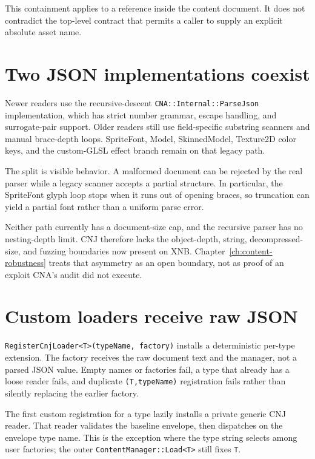 This containment applies to a reference inside the content document.  It does not contradict
the top-level  contract that permits a caller to supply an explicit
absolute asset name.

\section{Two JSON implementations coexist}

Newer readers use the recursive-descent \texttt{CNA::Internal::ParseJson} implementation, which
has strict number grammar, escape handling, and surrogate-pair support.  Older readers still use
field-specific substring scanners and manual brace-depth loops.  SpriteFont, Model, SkinnedModel,
Texture2D color keys, and the custom-GLSL effect branch remain on that legacy path.

The split is visible behavior.  A malformed document can be rejected by the real parser while a
legacy scanner accepts a partial structure.  In particular, the SpriteFont glyph loop stops when
it runs out of opening braces, so truncation can yield a partial font rather than a uniform parse
error.

Neither path currently has a document-size cap, and the recursive parser has no nesting-depth
limit.  CNJ therefore lacks the object-depth, string, decompressed-size, and fuzzing boundaries
now present on XNB.  Chapter~\ref{ch:content-robustness} treats that asymmetry as an open boundary,
not as proof of an exploit CNA's audit did not execute.

\section{Custom loaders receive raw JSON}

\texttt{RegisterCnjLoader<T>(typeName, factory)} installs a deterministic per-type extension.
The factory receives the raw document text and the manager, not a parsed JSON value.  Empty names
or factories fail, a type that already has a loose reader fails, and duplicate
\texttt{(T,typeName)} registration fails rather than silently replacing the earlier factory.

The first custom registration for a type lazily installs a private generic CNJ reader.  That
reader validates the baseline envelope, then dispatches on the envelope type name.  This is the
exception where the type string selects among user factories; the outer
\texttt{ContentManager::Load<T>} still fixes \texttt{T}.

